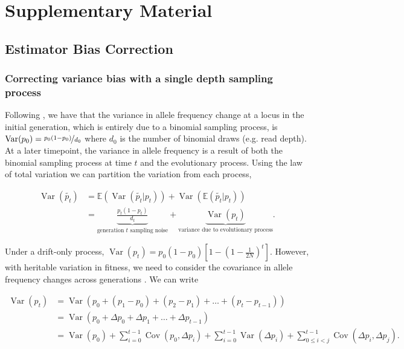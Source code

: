 \documentclass[11pt]{article}
\newcommand{\beginsupplement}{%
        \setcounter{table}{0}
        \renewcommand{\thetable}{S\arabic{table}}%
        \setcounter{figure}{0}
        \renewcommand{\thefigure}{S\arabic{figure}}%
     }
\newcommand{\E}{\mathbb{E}}
\DeclareMathOperator{\var}{Var}
\DeclareMathOperator{\cov}{Cov}
\begin{document}
\printbibliography


\setcounter{section}{1}
\section*{Supplementary Material}
\beginsupplement

\subsection{Estimator Bias Correction}
\subsubsection{Correcting variance bias with a single depth sampling process}
\label{supp:depth-var-corr}

Following \textcite{Waples1989-sj}, we have that the variance in allele
frequency change at a locus in the initial generation, which is entirely due to
a binomial sampling process, is $\var(p_0) = \nicefrac{p_0(1-p_0)}{d_0}$
where $d_0$ is the number of binomial draws (e.g. read depth). At a later
timepoint, the variance in allele frequency is a result of both the binomial
sampling process at time $t$ and the evolutionary process. Using the law of
total variation we can partition the variation from each process,

\begin{align}
  \var(\widetilde{p_t}) &= \E(\var(\widetilde{p_t} | p_t)) + \var(\E(\widetilde{p_t}|p_t)) \\
                        &= \underbrace{\frac{p_t(1-p_t)}{d_t}}_\text{generation $t$ sampling noise} + \underbrace{\var(p_t)}_\text{variance due to evolutionary process}.
\end{align}

Under a drift-only process, $\var(p_t) = p_0(1-p_0)\left[1- \left(1 -
\frac{1}{2N}\right)^t\right]$. However, with heritable variation in fitness, we
need to consider the covariance in allele frequency changes across generations
\parencite{Buffalo2019-io}. We can write

\begin{align}
  \var(p_t) &= \var\left(p_0 + (p_1 - p_0) + (p_2 - p_1) + \ldots + (p_t - p_{t-1}) \right) \\
         &= \var\left(p_0 + \Delta p_0 + \Delta p_1 + \ldots + \Delta p_{t-1} \right) \\
         &= \var(p_0) + \sum_{i=0}^{t-1} \cov(p_0, \Delta p_i) + \sum_{i=0}^{t-1} \var(\Delta p_i) + \sum_{0 \le i < j}^{t-1} \cov(\Delta p_i, \Delta p_j).
\end{align}
%
\end{document}
